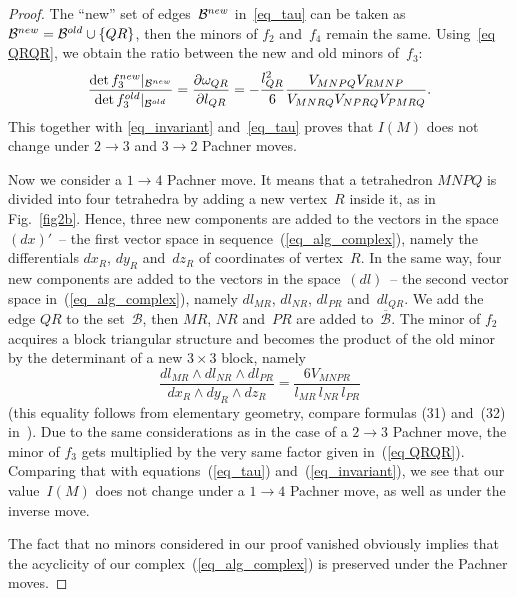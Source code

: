 \documentclass[11pt]{article}
\begin{document}
\begin{proof}
The ``new'' set of edges~$\mathcal B^{\rm new}$ in~\eqref{eq_tau} can be taken as $\mathcal B^{\rm new} = \mathcal B^{\rm old} \cup\{QR\}$, then the minors of $f_2$ and~$f_4$ remain the same. Using~\eqref{eq QRQR}, we obtain the ratio between the new and old minors of~$f_3$:
\begin{equation}
\frac{\det f_3^{\rm new} |_{\mathcal B^{\rm new}}}{\det f_3^{\rm old} |_{\mathcal B^{\rm old}}} = \frac{\partial\omega_{QR}}{\partial l_{QR}} = - \frac{l_{QR}^2}{6}\frac{V_{MNPQ}V_{RMNP}}{V_{MNRQ}V_{NPRQ}V_{PMRQ}}  .
\label{eq QRQR minors}
\end{equation}
This together with \eqref{eq_invariant} and~\eqref{eq_tau} proves that $I(M)$ does not change under $2\to 3$ and $3\to 2$ Pachner moves.

Now we consider a $1\to 4$ Pachner move. It means that a tetrahedron $MNPQ$ is divided into four tetrahedra by adding a new vertex~$R$ inside it, as in Fig.~\ref{fig2b}. Hence, three new components are added to the vectors in the space~$(dx)'$~-- the f\/irst vector space in sequence~(\ref{eq_alg_complex}), namely the dif\/ferentials $dx_R$, $dy_R$ and~$dz_R$ of coordinates of vertex~$R$. In the same way, four new components are added to the vectors in the space~$(dl)$~-- the second vector space in~(\ref{eq_alg_complex}), namely $dl_{MR}$, $dl_{NR}$, $dl_{PR}$ and~$dl_{QR}$. We add the edge $QR$ to the set~$\mathcal B$, then $MR$, $NR$ and~$PR$ are added to~$\overline{\mathcal B}$. The minor of $f_2$ acquires a block triangular structure and becomes the product of the old minor by the determinant of a new $3\times 3$ block, namely
\begin{equation*}
\frac{dl_{MR}\wedge dl_{NR}\wedge dl_{PR}}{dx_R\wedge dy_R\wedge dz_R} = \frac{6V_{MNPR}}{l_{MR}\,l_{NR}\,l_{PR}}
\end{equation*}
(this equality follows from elementary geometry, compare formulas (31) and~(32) in~\cite{JNMP1}). Due to the same considerations as in the case of a $2\to 3$ Pachner move, the minor of $f_3$ gets multiplied by the very same factor given in~(\ref{eq QRQR}). Comparing that with equations~(\ref{eq_tau}) and~(\ref{eq_invariant}), we see that our value~$I(M)$ does not change under a $1\to 4$ Pachner move, as well as under the inverse move.

The fact that no minors considered in our proof vanished obviously implies that the acyclicity of our complex~(\ref{eq_alg_complex}) is preserved under the Pachner moves.
\end{proof}
\end{document}
